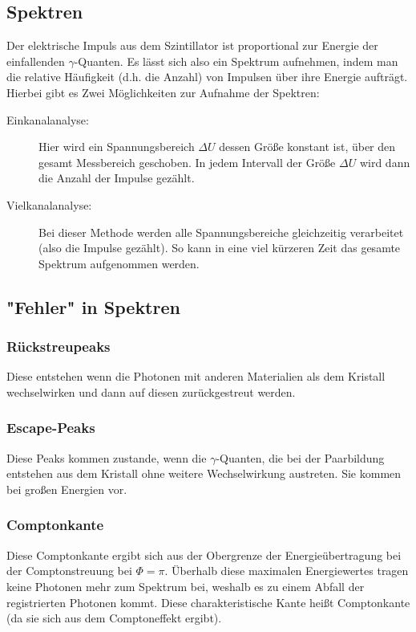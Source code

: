 \documentclass[a4paper,titlepage]{scrartcl}
\numberwithin{equation}{section}
\begin{document}
\subsection{Spektren} 

Der elektrische Impuls aus dem Szintillator ist proportional zur Energie der einfallenden $\gamma $-Quanten. Es lässt sich also ein Spektrum aufnehmen, indem man die relative Häufigkeit (d.h. die Anzahl) von Impulsen über ihre Energie aufträgt. Hierbei gibt es Zwei Möglichkeiten zur Aufnahme der Spektren:

\begin{description}
\item[Einkanalanalyse:]Hier wird ein Spannungsbereich $\Delta U$ dessen Größe konstant ist, über den gesamt Messbereich geschoben. In jedem Intervall der Größe $\Delta U$ wird dann die Anzahl der Impulse gezählt.

\item[Vielkanalanalyse:]Bei dieser Methode werden alle Spannungsbereiche gleichzeitig verarbeitet (also die Impulse gezählt). So kann in eine viel kürzeren Zeit das gesamte Spektrum aufgenommen werden.
\end{description}

\subsection{"Fehler" in Spektren}

\subsubsection{Rückstreupeaks}

Diese entstehen wenn die Photonen mit anderen Materialien als dem Kristall wechselwirken und dann auf diesen zurückgestreut werden.

\subsubsection{Escape-Peaks}

Diese Peaks kommen zustande, wenn die $\gamma $-Quanten, die bei der Paarbildung entstehen aus dem Kristall ohne weitere Wechselwirkung austreten. Sie kommen bei großen Energien vor.

\subsubsection{Comptonkante}

Diese Comptonkante ergibt sich aus der Obergrenze der Energieübertragung bei der Comptonstreuung bei $\Phi = \pi$. Überhalb diese maximalen Energiewertes tragen keine Photonen mehr zum Spektrum bei, weshalb es zu einem Abfall der registrierten Photonen kommt. Diese charakteristische Kante heißt Comptonkante (da sie sich aus dem Comptoneffekt ergibt).
\end{document}
